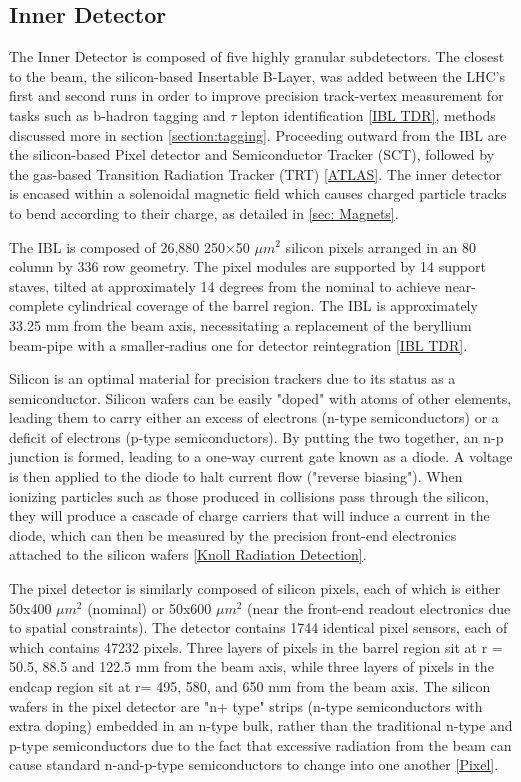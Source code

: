 \subsection{Inner Detector} \label{sec:ID} 

The Inner Detector is composed of five highly granular subdetectors. The closest to the beam, the silicon-based Insertable B-Layer, was added between the LHC's first and second runs in order to improve precision track-vertex measurement for tasks such as b-hadron tagging and \( \tau\) lepton identification \ref{IBL TDR}, methods discussed more in section \ref{section:tagging}. Proceeding outward from the IBL are the silicon-based Pixel detector and Semiconductor Tracker (SCT), followed by the gas-based Transition Radiation Tracker (TRT) \ref{ATLAS}. The inner detector is encased within a solenoidal magnetic field which causes charged particle tracks to bend according to their charge, as detailed in \ref{sec: Magnets}.

The IBL is composed of 26,880 250×50 \(μm^2\) silicon pixels arranged in an 80 column by 336 row geometry. The pixel modules are supported by 14 support staves, tilted at approximately 14 degrees from the nominal to achieve near-complete cylindrical coverage of the barrel region. The IBL is approximately 33.25 mm from the beam axis, necessitating a replacement of the beryllium beam-pipe with a smaller-radius one for detector reintegration \ref{IBL TDR}.

Silicon is an optimal material for precision trackers due to its status as a semiconductor. Silicon wafers can be easily "doped" with atoms of other elements, leading them to carry either an excess of electrons (n-type semiconductors) or a deficit of electrons (p-type semiconductors). By putting the two together, an n-p junction is formed, leading to a one-way current gate known as a diode. A voltage is then applied to the diode to halt current flow ("reverse biasing"). When ionizing particles such as those produced in collisions pass through the silicon, they will produce a cascade of charge carriers that will induce a current in the diode, which can then be measured by the precision front-end electronics attached to the silicon wafers \ref{Knoll Radiation Detection}.

The pixel detector is similarly composed of silicon pixels, each of which is either 50x400 \(μm^2\) (nominal) or 50x600 \(μm^2\) (near the front-end readout electronics due to spatial constraints). The detector contains 1744 identical pixel sensors, each of which contains 47232 pixels. Three layers of pixels in the barrel region sit at r = 50.5,  88.5 and 122.5 mm from the beam axis, while three layers of pixels in the endcap region sit at r= 495, 580, and 650 mm from the beam axis. The silicon wafers in the pixel detector are "n+ type" strips (n-type semiconductors with extra doping) embedded in an n-type bulk, rather than the traditional n-type and p-type semiconductors due to the fact that excessive radiation from the beam can cause standard n-and-p-type semiconductors to change into one another \ref{Pixel}. 

